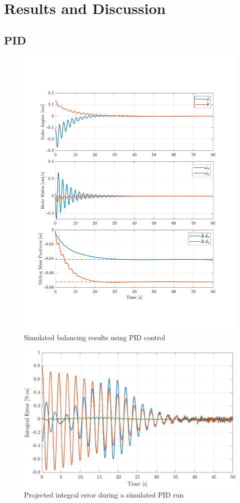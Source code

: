 \chapter{Results and Discussion}

\section{PID}
\begin{figure}[ht]
    \centering
    \includegraphics[width=\linewidth]{plots/PID_sim_results.pdf}
    \caption{Simulated balancing results using PID control}
\end{figure}

\begin{figure}[ht]
    \centering
    \includegraphics[width=\linewidth]{plots/PID_sim_integral_error.png}
    \caption{Projected integral error during a simulated PID run}
\end{figure}

